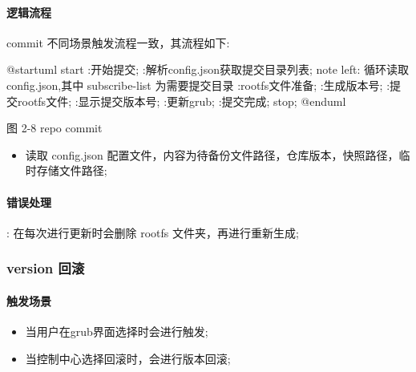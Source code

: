 \documentclass{utart}
\begin{document}
\paragraph{逻辑流程}
commit 不同场景触发流程一致，其流程如下: 
\begin{center}
  \begin{adjustbox}{scale=0.65}
    \begin{plantuml}
      @startuml
      start
      :开始提交;
      :解析config.json获取提交目录列表;
      note left: 循环读取config.json,其中 subscribe-list 为需要提交目录
      :rootfs文件准备;
      :生成版本号;
      :提交rootfs文件;
      :显示提交版本号;
      :更新grub;
      :提交完成;
      stop;
      @enduml
    \end{plantuml}
  \end{adjustbox}

  图 2-8 repo commit
\end{center}

\begin{itemize}[leftmargin=4em]
  \item 读取 config.json 配置文件，内容为待备份文件路径，仓库版本，快照路径，临时存储文件路径;
\end{itemize}
\paragraph{错误处理}
\begin{description}[leftmargin=!]
  \item[更新rootfs错误:] : 在每次进行更新时会删除 rootfs 文件夹，再进行重新生成;
\end{description}

\subsubsection{version 回滚}
\paragraph{触发场景}
\begin{itemize}[leftmargin=4em]
  \item 当用户在grub界面选择时会进行触发;
  \item 当控制中心选择回滚时，会进行版本回滚;
\end{itemize}
\end{document}

